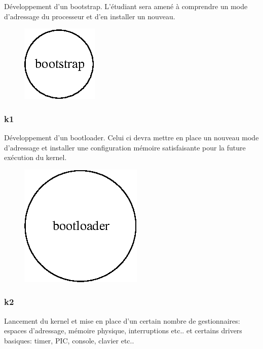 \documentclass[10pt,a4wide]{article}
\begin{document}
D\'eveloppement d'un bootstrap. L'\'etudiant sera amen\'e \`a comprendre
un mode d'adressage du processeur et d'en installer un nouveau.

\vspace{5cm}

\begin{figure}[h]
\centerline{\includegraphics{figures/k0.eps}}
\end{figure}

\newpage

\subsubsection{k1}

D\'eveloppement d'un bootloader. Celui ci devra mettre en place un nouveau
mode d'adressage et installer une configuration m\'emoire satisfaisante pour
la future ex\'ecution du kernel.

\vspace{5cm}

\begin{figure}[h]
\centerline{\includegraphics{figures/k1.eps}}
\end{figure}

\newpage

\subsubsection{k2}

Lancement du kernel et mise en place d'un certain nombre de gestionnaires:
espaces d'adressage, m\'emoire physique, interruptions etc.. et certains
drivers basiques: timer, PIC, console, clavier etc..
\end{document}
